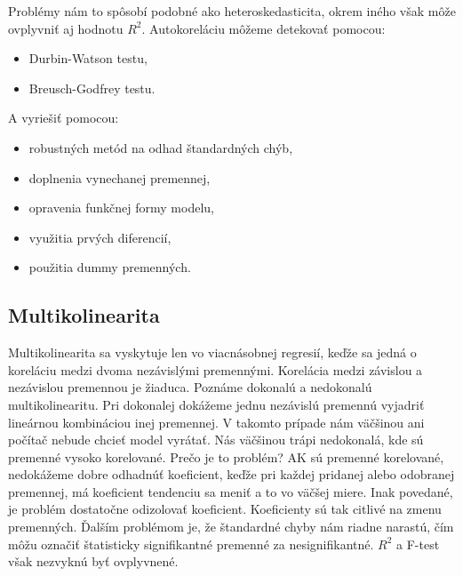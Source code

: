 \begin{Shaded}
\begin{Highlighting}[]
\end{Highlighting}
\end{Shaded}

Problémy nám to spôsobí podobné ako heteroskedasticita, okrem iného však
môže ovplyvniť aj hodnotu \(R^2\). Autokoreláciu môžeme detekovať
pomocou:

\begin{itemize}
\tightlist
\item
  Durbin-Watson testu,
\item
  Breusch-Godfrey testu.
\end{itemize}

A vyriešiť pomocou:

\begin{itemize}
\tightlist
\item
  robustných metód na odhad štandardných chýb,
\item
  doplnenia vynechanej premennej,
\item
  opravenia funkčnej formy modelu,
\item
  využitia prvých diferencií,
\item
  použitia dummy premenných.
\end{itemize}

\hypertarget{multikolinearita}{%
\subsection{Multikolinearita}\label{multikolinearita}}

Multikolinearita sa vyskytuje len vo viacnásobnej regresií, keďže sa
jedná o koreláciu medzi dvoma nezávislými premennými. Korelácia medzi
závislou a nezávislou premennou je žiaduca. Poznáme dokonalú a
nedokonalú multikolinearitu. Pri dokonalej dokážeme jednu nezávislú
premennú vyjadriť lineárnou kombináciou inej premennej. V takomto
prípade nám väčšinou ani počítač nebude chcieť model vyrátať. Nás
väčšinou trápi nedokonalá, kde sú premenné vysoko korelované. Prečo je
to problém? AK sú premenné korelované, nedokážeme dobre odhadnúť
koeficient, keďže pri každej pridanej alebo odobranej premennej, má
koeficient tendenciu sa meniť a to vo väčšej miere. Inak povedané, je
problém dostatočne odizolovať koeficient. Koeficienty sú tak citlivé na
zmenu premenných. Ďalším problémom je, že štandardné chyby nám riadne
narastú, čím môžu označiť štatisticky signifikantné premenné za
nesignifikantné. \(R^2\) a F-test však nezvyknú byť ovplyvnené.

